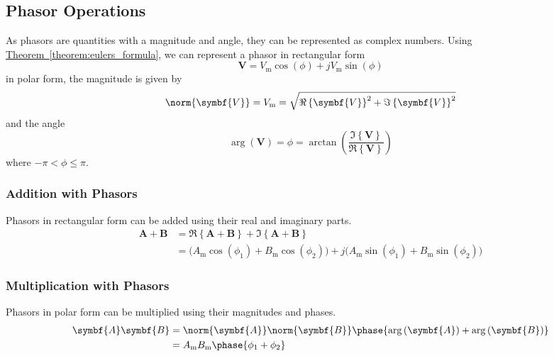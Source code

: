 \documentclass{article}
\begin{document}
\subsection{Phasor Operations}
As phasors are quantities with a magnitude and angle, they can be represented as complex numbers.
Using \hyperref[theorem:eulers_formula]{Theorem~\ref{theorem:eulers_formula}}, we can represent a phasor in rectangular form
\begin{equation*}
    \symbf{V} = V_{\mathrm{m}} \cos{\left( \phi \right)} + j V_{\mathrm{m}} \sin{\left( \phi \right)}
\end{equation*}
in polar form, the magnitude is given by
\begin{equation*}
    \norm{\symbf{V}} = V_{\mathrm{m}} = \sqrt{\Re\left\{ \symbf{V} \right\}^2 + \Im\left\{ \symbf{V} \right\}^2}
\end{equation*}
and the angle
\begin{equation*}
    \arg{\left( \symbf{V} \right)} = \phi = \arctan{\left( \frac{\Im\left\{ \symbf{V} \right\}}{\Re\left\{ \symbf{V} \right\}} \right)}
\end{equation*}
where $-\pi < \phi \leq \pi$.
\subsubsection{Addition with Phasors}
Phasors in rectangular form can be added using their real and imaginary parts.
\begin{align*}
    \symbf{A} + \symbf{B} & = \Re\left\{ \symbf{A} + \symbf{B} \right\} + \Im\left\{ \symbf{A} + \symbf{B} \right\}                                                                                                                      \\
                          & = \bigl( A_{\mathrm{m}}\cos{\left( \phi_1 \right)} + B_{\mathrm{m}}\cos{\left( \phi_2 \right)} \bigr) + j\bigl( A_{\mathrm{m}}\sin{\left( \phi_1 \right)} + B_{\mathrm{m}}\sin{\left( \phi_2 \right)} \bigr)
\end{align*}
\subsubsection{Multiplication with Phasors}
Phasors in polar form can be multiplied using their magnitudes and phases.
\begin{align*}
    \symbf{A} \symbf{B} & = \norm{\symbf{A}} \norm{\symbf{B}} \phase{\arg{\left( \symbf{A} \right)} + \arg{\left( \symbf{B} \right)}} \\
                        & = A_{\mathrm{m}} B_{\mathrm{m}} \phase{\phi_1 + \phi_2}
\end{align*}
\end{document}
